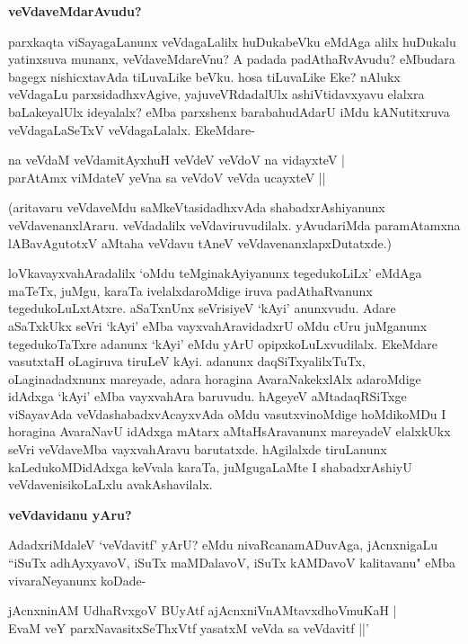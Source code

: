 {\bigskip
\noindent
{\large\bf veVdaveMdarAvudu?}}\label{page132}
\medskip

\noindent
parxkaqta viSayagaLanunx veVdagaLalilx huDukabeVku eMdAga alilx huDukalu yatinxsuva munanx, veVda\-veMdareVnu? A padada padAthaRvAvudu? eMbudara bagegx nishicxtavAda tiLuvaLike beVku. hosa tiLu\-vaLike Eke? nAlukx veVdagaLu parxsidadhxvAgive, yajuveVRdadalUlx ashiVtidavxyavu elalxra baLake\-yalUlx ideyalalx? eMba parxshenx barabahudAdarU iMdu kANutitxruva veVdagaLaSeTxV veVdagaLalalx. EkeMdare-

\begin{shloka}
na veVdaM veVdamitAyxhuH veVdeV veVdoV na vidayxteV |\\\label{132}
parAtAmx viMdateV yeVna sa veVdoV veVda ucayxteV ||
\end{shloka}

\noindent
(aritavaru veVdaveMdu saMkeVtasidadhxvAda shabadxrAshiyanunx veVdavenanxlAraru. veVdadalilx veVdaviruvu\-dilalx. yAvudariMda paramAtamxna lABavAgutotxV aMtaha veVdavu tAneV veVdavenanxlapxDutatxde.) 

loVka\-vayxva\-hAradalilx `oMdu teMginakAyiyanunx tegedukoLiLx' eMdAga maTeTx, juMgu, karaTa ivelalxdaroMdige iruva padAthaRvanunx tegedukoLuLxtAtxre. aSaTxnUnx seVrisiyeV `kAyi' anunxvudu. Adare aSaTxkUkx seVri `kAyi' eMba vayxvahAravidadxrU oMdu cUru juMganunx tegedukoTaTxre adanunx `kAyi' eMdu yArU opipxkoLuLxvudilalx. EkeMdare vasutxtaH oLagiruva tiruLeV kAyi. adanunx daqSiTxyalilxTuTx, oLaginadadxnunx mareyade, adara horagina AvaraNakekxlAlx adaroMdige idAdxga `kAyi' eMba vayxvahAra baruvudu. hAgeyeV aMtadaqRSiTxge viSayavAda veVdashabadxvAcayxvAda oMdu vasutxvinoMdige hoMdikoMDu I horagina AvaraNavU idAdxga mAtarx aMtaHsAravanunx mareyadeV elalxkUkx seVri veVdaveMba vayxva\-hAravu barutatxde. hAgilalxde tiruLanunx kaLedukoMDidAdxga keVvala karaTa, juMgugaLaMte I shabadx\-rAshiyU veVda\-venisikoLaLxlu avakAshavilalx.

{\bigskip
\noindent
{\large\bf veVdavidanu yAru?}}\label{page133}
\medskip

\noindent
AdadxriMdaleV `veVdavitf' yArU? eMdu nivaRcanamADuvAga, jAcnxnigaLu ``iSuTx adhAyxyavoV, iSuTx maMDalavoV, iSuTx kAMDavoV kalitavanu" eMba vivaraNeyanunx koDade-

\begin{shloka}
jAcnxninAM UdhaRvxgoV BUyAtf ajAcnxniVnAMtavxdhoVmuKaH |\\\label{133}
EvaM veY parxNavasitxSeThxVtf yasatxM veVda sa veVdavitf ||'
\end{shloka}


